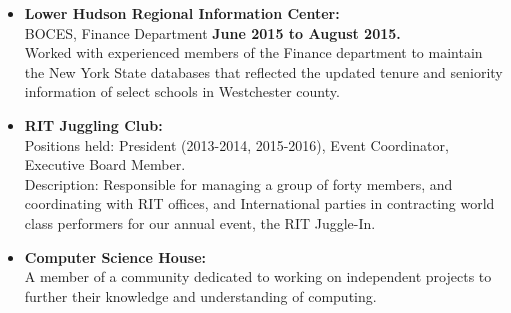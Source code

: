 \documentclass[10pt]{article}
\begin{document}
\begin{itemize}[topsep=1ex, itemsep=1ex, partopsep=0ex, parsep=.25ex]
	\item[]{{\bf Lower Hudson Regional Information Center:}\\ 
	BOCES, Finance Department \hfill {\bf June 2015 to August 2015.}}\\
	Worked with experienced members of the Finance department to maintain the New York
	State databases that reflected the updated tenure and seniority information of select schools in Westchester county.
\end{itemize}
\vspace{.75ex}
\begin{itemize} [topsep=1ex, itemsep=.25ex, partopsep=0ex, parsep=.25ex]
	\item[] {\bf RIT Juggling Club:}\\
	Positions held: President (2013-2014, 2015-2016), Event Coordinator, Executive Board Member.\\
	Description: Responsible for managing a group of forty members, and coordinating with RIT offices, and International parties in contracting world class performers for our annual event, the RIT Juggle-In.
	\item[] {\bf Computer Science House:}\\
	A member of a community dedicated to working on independent projects to further their knowledge and understanding of computing.
\end{itemize}
\end{document}
